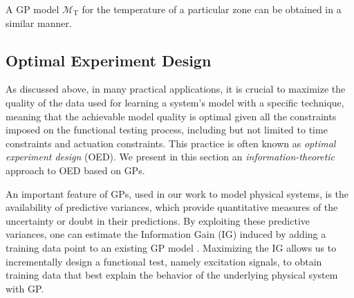 A GP model $\mathcal{M}_{\mathrm{T}}$ for the temperature of a particular zone can be obtained in a similar manner.


% 	

\subsection{Optimal Experiment Design} %
\label{sec:modeling:oed}

As discussed above, in many practical applications, it is crucial to maximize the quality of the data used for learning a system's model with a specific technique, meaning that the achievable model quality is optimal given all the constraints imposed on the functional testing process, including but not limited to time constraints and actuation constraints.
This practice is often known as \emph{optimal experiment design} (OED).
We present in this section an \emph{information-theoretic} approach to OED based on GPs.

An important feature of GPs, used in our work to model physical systems, is the availability of predictive variances, which provide quantitative measures of the uncertainty or doubt in their predictions.
By exploiting these predictive variances, one can estimate the Information Gain (IG) induced by adding a training data point to an existing GP model \cite{Krause2008} .
Maximizing the IG allows us to incrementally design a functional test, namely excitation signals, to obtain training data that best explain the behavior of the underlying physical system with GP.

